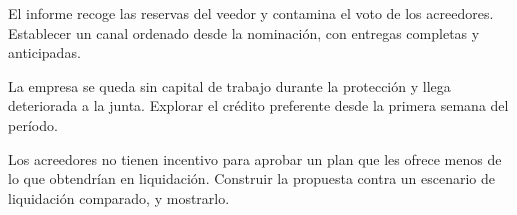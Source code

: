 {El informe recoge las reservas del veedor y contamina el voto de los acreedores.}
{Establecer un canal ordenado desde la nominación, con entregas completas y anticipadas.}

{La empresa se queda sin capital de trabajo durante la protección y llega deteriorada a
la junta.}
{Explorar el crédito preferente desde la primera semana del período.}

{Los acreedores no tienen incentivo para aprobar un plan que les ofrece menos de lo que
obtendrían en liquidación.}
{Construir la propuesta contra un escenario de liquidación comparado, y mostrarlo.}
